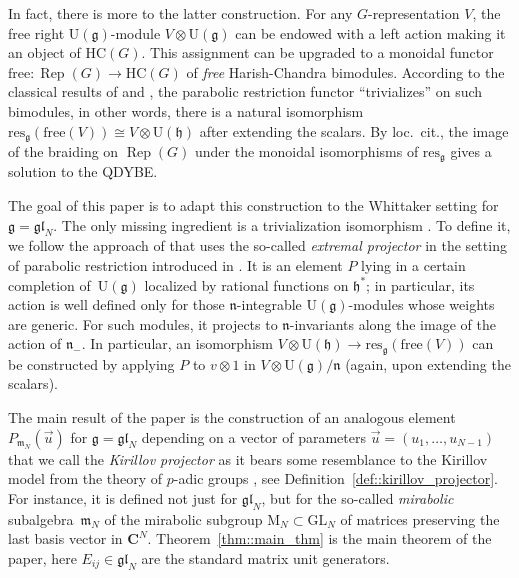 \documentclass[10pt,a4paper]{article}
\numberwithin{equation}{section}
\newcommand{\C}{\mathbf{C}}
\newcommand{\Z}{\mathbf{Z}}
\newcommand{\GL}{\mathrm{GL}}
\newcommand{\g}{\mathfrak{g}}
\newcommand{\h}{\mathfrak{h}}
\newcommand{\n}{\mathfrak{n}}
\newcommand{\m}{\mathfrak{m}}
\newcommand{\free}{\mathrm{free}}
\DeclareMathOperator{\Rep}{Rep}
\newcommand{\res}{\mathrm{res}}
\newcommand{\gl}{\mathfrak{gl}}
\begin{document}
	In fact, there is more to the latter construction. For any $G$-representation $V$, the free right $\mathrm{U}(\g)$-module $V \otimes \mathrm{U}(\g)$ can be endowed with a left action making it an object of $\mathrm{HC}(G)$. This assignment can be upgraded to a monoidal functor $\free \colon \Rep(G) \rightarrow \mathrm{HC}(G)$ of \emph{free} Harish-Chandra bimodules. According to the classical results of \cite{ZhelobenkoSalgebras} and \cite{EtingofVarchenkoExchange}, the parabolic restriction functor ``trivializes'' on such bimodules, in other words, there is a natural isomorphism~${\res_{\g}(\free(V)) \cong V \otimes \mathrm{U}(\h)}$ after extending the scalars. By loc.\ cit., the image of the braiding on $\Rep(G)$ under the monoidal isomorphisms of $\res_{\g}$ gives a solution to the QDYBE.
	
	The goal of this paper is to adapt this construction to the Whittaker setting for $\g=\gl_N$. The only missing ingredient is a trivialization isomorphism \smash{$\res_{\gl_N}^{\psi}(\free(V)) \cong V \otimes \Z_{\gl_N}$}. To define it, we follow the approach of \cite{ZhelobenkoSalgebras} that uses the so-called \emph{extremal projector} in the setting of parabolic restriction introduced in \cite{AsherovaSmirnovTolstoy}. It is an element $P$ lying in a certain completion of~$\mathrm{U}(\g)$ localized by rational functions on $\h^*$; in particular, its action is well defined only for those $\n$-integrable $\mathrm{U}(\g)$-modules whose weights are generic. For such modules, it projects to $\n$-invariants along the image of the action of $\n_-$. In particular, an isomorphism $V \otimes \mathrm{U}(\h) \rightarrow \res_{\g}(\free(V))$ can be constructed by applying $P$ to $v\otimes 1$ in $V \otimes \mathrm{U}(\g)/\n$ (again, upon extending the scalars).
	
	The main result of the paper is the construction of an analogous element $P_{\m_N}(\vec{u})$ for $\g=\gl_N$ depending on a vector of parameters $\vec{u}=(u_1,\dots,u_{N-1})$ that we call the \emph{Kirillov projector} as it bears some resemblance to the Kirillov model from the theory of $p$-adic groups \cite{Kirillov}, see Definition~\ref{def::kirillov_projector}. For instance, it is defined not just for $\gl_N$, but for the so-called \emph{mirabolic} subalgebra~$\m_N$ of the mirabolic subgroup $\mathrm{M}_N \subset \GL_N$ of matrices preserving the last basis vector in $\C^N$. Theorem~\ref{thm::main_thm} is the main theorem of the paper, here $E_{ij} \in \gl_N$ are the standard matrix unit generators.
	
\end{document}
